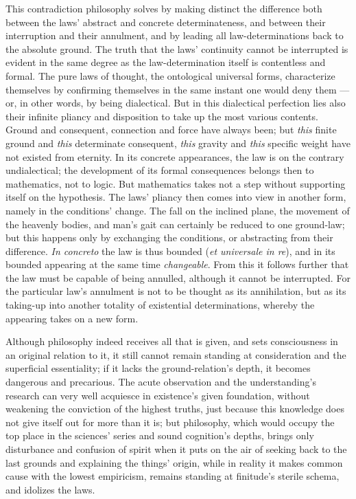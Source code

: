 \documentclass[12pt]{book}
\begin{document}
This contradiction philosophy solves by making distinct the difference both
between the laws' abstract and concrete determinateness, and between their
interruption and their annulment, and by leading all law-determinations back
to the absolute ground. The truth that the laws' continuity cannot be
interrupted is evident in the same degree as the law-determination itself is
contentless and formal. The pure laws of thought, the ontological universal
forms, characterize themselves by confirming themselves in the same instant
one would deny them --- or, in other words, by being dialectical. But in
this dialectical perfection lies also their infinite pliancy and disposition
to take up the most various contents. Ground and consequent, connection and
force have always been; but \emph{this} finite ground and \emph{this}
determinate consequent, \emph{this} gravity and \emph{this} specific weight
have not existed from eternity. In its concrete appearances, the law is on
the contrary undialectical; the development of its formal consequences
belongs then to mathematics, not to logic. But mathematics takes not a step
without supporting itself on the hypothesis. The laws' pliancy then comes
into view in another form, namely in the conditions' change. The fall on the
inclined plane, the movement of the heavenly bodies, and man's gait can
certainly be reduced to one ground-law; but this happens only by exchanging
the conditions, or abstracting from their difference. \textit{In concreto}
the law is thus bounded (\textit{et universale in re}), and in its bounded
appearing at the same time \emph{changeable}. From this it follows further
that the law must be capable of being annulled, although it cannot be
interrupted. For the particular law's annulment is not to be thought as its
annihilation, but as its taking-up into another totality of existential
determinations, whereby the appearing takes on a new form.

Although philosophy indeed receives all that is given, and sets
consciousness in an original relation to it, it still cannot remain standing
at consideration and the superficial essentiality; if it lacks the
ground-relation's depth, it becomes dangerous and precarious. The acute
observation and the understanding's research can very well acquiesce in
existence's given foundation, without weakening the conviction of the
highest truths, just because this knowledge does not give itself out for
more than it is; but philosophy, which would occupy the top place in the
sciences' series and sound cognition's depths, brings only disturbance and
confusion of spirit when it puts on the air of seeking back to the last
grounds and explaining the things' origin, while in reality it makes common
cause with the lowest empiricism, remains standing at finitude's sterile
schema, and idolizes the laws.
\end{document}
